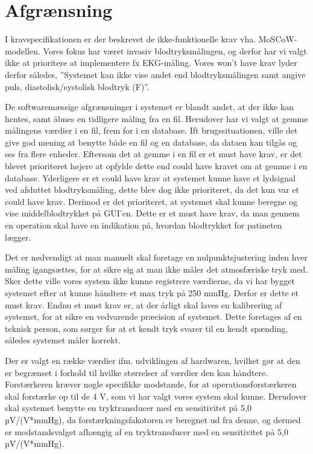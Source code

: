 \section{Afgrænsning}
I kravspecifikationen er der beskrevet de ikke-funktionelle krav vha. MoSCoW- modellen. Vores fokus har været invasiv blodtryksmålingen, og derfor har vi valgt ikke at prioritere at implementere fx EKG-måling. Vores won’t have krav lyder derfor således, ”Systemet kan ikke vise andet end blodtryksmålingen samt angive puls, diastolisk/systolisk blodtryk (F)”.

De softwaremæssige afgrænsninger i systemet er blandt andet, at der ikke kan hentes, samt åbnes en tidligere måling fra en fil. Herudover har vi valgt at gemme målingens værdier i en fil, frem for i en database. Ift brugssituationen, ville det give god mening at benytte både en fil og en database, da dataen kan tilgås og ses fra flere enheder. Eftersom det at gemme i en fil er et must have krav, er det blevet prioriteret højere at opfylde dette end could have kravet om at gemme i en database. Yderligere er et could have krav at systemet kunne have et lydsignal ved afsluttet blodtryksmåling, dette blev dog ikke prioriteret, da det kun var et could have krav. Derimod er det prioriteret, at systemet skal kunne beregne og vise middelblodtrykket på GUI'en. Dette er et must have krav, da man gennem en operation skal have en indikation på, hvordan blodtrykket for patineten lægger.

Det er nødvendigt at man manuelt skal foretage en nulpunktsjustering inden hver måling igangsættes, for at sikre sig at man ikke måler det atmosfæriske tryk med. Sker dette ville vores system ikke kunne registrere værdierne, da vi har bygget systemet efter at kunne håndtere et max tryk på 250 mmHg. Derfor er dette et must krav. Endnu et must krav er, at der årligt skal laves en kalibrering af systemet, for at sikre en vedvarende præcision af systemet. Dette foretages af en teknisk person, som sørger for at et kendt tryk svarer til en kendt spænding, således systemet måler korrekt.

Der er valgt en række værdier ifm. udviklingen af hardwaren, hvilket gør at den er begrænset i forhold til hvilke størrelser af værdier den kan håndtere. Forstærkeren kræver nogle specifikke modstande, for at operationsforstærkeren skal forstærke op til de 4 V, som vi har valgt vores system skal kunne. Derudover skal systemet benytte en tryktransducer med en sensitivitet på 5,0 µV/(V*mmHg), da forstærkningsfakotoren er beregnet ud fra denne, og dermed er modstandsvalget afhængig af en tryktransducer med en sensitivitet på 5,0 µV/(V*mmHg).

